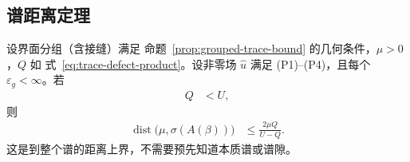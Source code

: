 \subsection{谱距离定理}
\label{subsec:spectral-distance}

\begin{theorem}[原始界面缺陷的谱距离界]
  \label{thm:spectral-distance}
  设界面分组（含接缝）满足
  命题~\ref{prop:grouped-trace-bound} 的几何条件，$\mu>0$，$Q$ 如
  式~\eqref{eq:trace-defect-product}。设非零场 $\widehat u$ 满足 (P1)--(P4)，且每个
  $\varepsilon_g<\infty$。若
  \begin{align}
    Q&<U,
    \label{eq:positive-denominator}
  \end{align}
  则
  \begin{align}
    \operatorname{dist}\bigl(\mu,\sigma(A(\beta))\bigr)
    &\leq\frac{2\mu Q}{U-Q}.
    \label{eq:spectral-distance-bound}
  \end{align}
  这是到整个谱的距离上界，不需要预先知道本质谱或谱隙。
\end{theorem}

